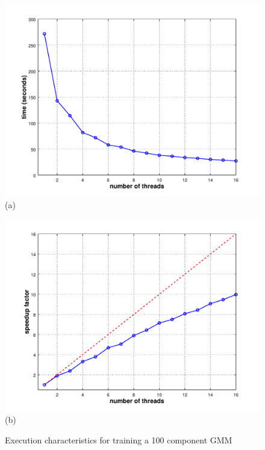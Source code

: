 \documentclass[10pt,a4paper]{article}
\begin{document}
\begin{figure}[!b]
\centering
\begin{minipage}{\textwidth}
  \centering
  \begin{minipage}{0.5\textwidth}
    \centering
    \includegraphics[width=1.1\textwidth]{plot1.pdf}\\
    {(a)}
  \end{minipage}%
  \begin{minipage}{0.5\textwidth}
    \centering
    \includegraphics[width=1.1\textwidth]{plot2.pdf}\\
    {(b)}
  \end{minipage}
\end{minipage}
\caption
  {
  Execution characteristics for training a 100 component GMM
}
\end{figure}
\end{document}
